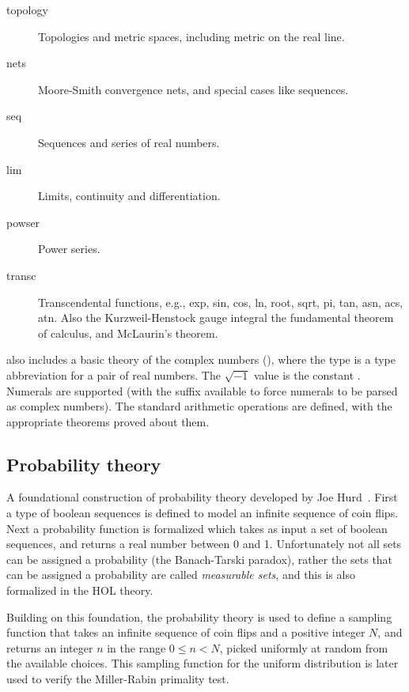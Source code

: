 \begin{description}
\item [topology] Topologies and metric spaces, including metric on
the real line.
\item [nets] Moore-Smith convergence nets, and special cases like
sequences.
\item [seq] Sequences and series of real numbers.
\item [lim] Limits, continuity and differentiation.
\item [powser] Power series.
\item [transc] Transcendental functions, e.g., exp, sin,
cos, ln, root, sqrt, pi, tan, asn, acs, atn. Also the Kurzweil-Henstock
gauge integral the fundamental theorem of calculus, and McLaurin's
theorem.

\end{description}

\noindent
\HOL{} also includes a basic theory of the complex numbers (), where the type  is a type abbreviation for a pair of real numbers.
The $\sqrt{-1}$ value is the \HOL{} constant .
Numerals are supported (with the suffix  available to force numerals to be parsed as complex numbers).
The standard arithmetic operations are defined, with the appropriate theorems proved about them.

\subsection{Probability theory}\label{prob}

A foundational construction of probability theory developed by Joe
Hurd~\cite{hurd-thesis}. First a type of boolean sequences is defined
to model an infinite sequence of coin flips. Next a probability
function is formalized which takes as input a set of boolean
sequences, and returns a real number between 0 and 1. Unfortunately
not all sets can be assigned a probability (the Banach-Tarski
paradox), rather the sets that can be assigned a probability are
called \emph{measurable sets}, and this is also formalized in the
HOL theory.

Building on this foundation, the probability theory is used to define
a sampling function that takes an infinite sequence of coin flips and
a positive integer $N$, and returns an integer $n$ in the range $0\le
n < N$, picked uniformly at random from the available choices. This
sampling function for the uniform distribution is later used to verify
the Miller-Rabin primality test.


